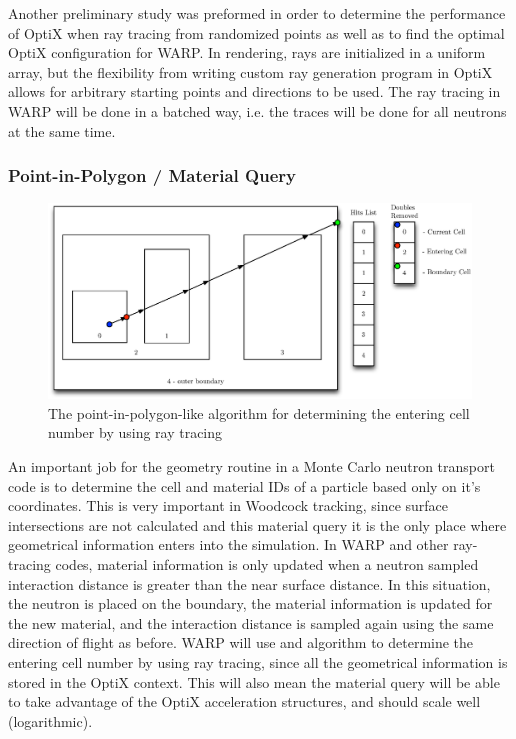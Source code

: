 Another preliminary study was preformed in order to determine the performance of OptiX when ray tracing from randomized points as well as to find the optimal OptiX configuration for WARP.  In rendering, rays are initialized in a uniform array, but the flexibility from writing custom ray generation program in OptiX allows for arbitrary starting points and directions to be used.  The ray tracing in WARP will be done in a batched way, i.e. the traces will be done for all neutrons at the same time.

\subsubsection{Point-in-Polygon / Material Query}

\begin{figure}[h!] 
  \centering
    \includegraphics[width=1.0\textwidth]{graphics/whereami.eps}
     \caption{The point-in-polygon-like algorithm for determining the entering cell number by using ray tracing \label{whereami} }
\end{figure}

An important job for the geometry routine in a Monte Carlo neutron transport code is to determine the cell and material IDs of a particle based only on it's coordinates.  This is very important in Woodcock tracking, since surface intersections are not calculated and this material query it is the only place where geometrical information enters into the simulation.  In WARP and other ray-tracing codes, material information is only updated when a neutron sampled interaction distance is greater than the near surface distance.  In this situation, the neutron is placed on the boundary, the material information is updated for the new material, and the interaction distance is sampled again using the same direction of flight as before.  WARP will use and algorithm to determine the entering cell number by using ray tracing, since all the geometrical information is stored in the OptiX context.  This will also mean the material query will be able to take advantage of the OptiX acceleration structures, and should scale well (logarithmic).

